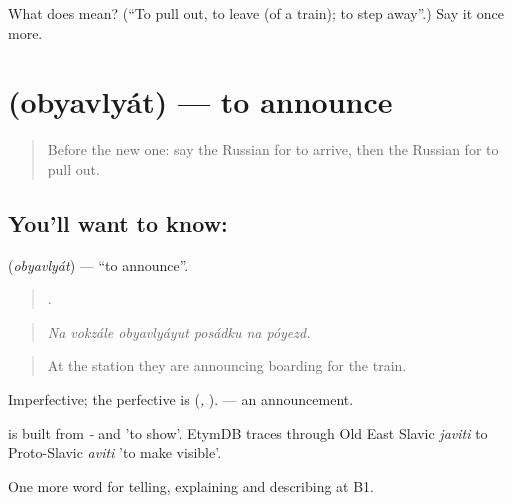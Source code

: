 \begin{tcolorbox}[breakable,colback=teal!4,colframe=teal!35!black,title={Before you move on}]
What does  mean? (\textquotedblleft{}To pull out, to leave (of a train); to step away\textquotedblright{}.) Say it once more.
\end{tcolorbox}
\section[\texorpdfstring{\ru{объявлять} (obyavlyát)}{объявлять (obyavlyát)}]{ (obyavlyát) — to announce}

\label{lesson:RU-C415-obyavlyat}



\begin{quote}
Before the new one: say the Russian for to arrive, then the Russian for to pull out.
\end{quote}

\subsection*{You'll want to know: }
\textbf{} (\emph{obyavlyát}) — \textquotedblleft{}to announce\textquotedblright{}.

\begin{quote}
     .
\end{quote}

\begin{quote}
\emph{Na vokzále obyavlyáyut posádku na póyezd.}
\end{quote}

\begin{quote}
At the station they are announcing boarding for the train.
\end{quote}

Imperfective; the perfective is \emph{} (\emph{, }). \emph{} — an announcement.

\begin{cousinweb}
\emph{} is built from \emph{-} and \emph{} 'to show'. EtymDB traces \emph{} through Old East Slavic \emph{javiti} to Proto-Slavic \emph{aviti} 'to make visible'.
\end{cousinweb}

\begin{grammarlens}[title={What you've built}]
One more word for telling, explaining and describing at B1.
\end{grammarlens}

